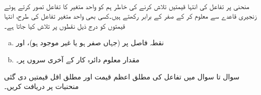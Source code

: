 \\
منحنی  پر تفاعل   کی انتہا قیمتیں تلاش کرنے کی خاطر  ہم  کو واحد متغیر  کا تفاعل تصور کرتے ہوئے   زنجیری قاعدے  سے   معلوم کر کے صفر کے برابر  رکھتے  ہیں۔کسی بھی واحد متغیر تفاعل کی طرح، انتہا قیمتوں کو درج ذیل نقطوں پر تلاش کیا جاتا ہے۔
\begin{enumerate}[a.]
\item
نقطہ فاصل پر  (جہاں  صفر ہو یا غیر موجود ہو)،   اور
\item
مقدار معلوم دائرہ کار کے آخری سروں پر۔
\end{enumerate}
سوال  تا سوال  میں تفاعل کی مطلق اعظم قیمت اور مطلق اقل قیمتیں دی گئی منحنیات پر  دریافت کریں۔

